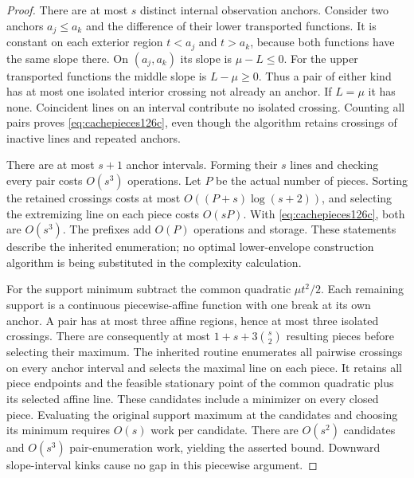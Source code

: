 \begin{proof}
There are at most $s$ distinct internal observation anchors.  Consider two
anchors $a_j\le a_k$ and the difference of their lower transported functions.
It is constant on each exterior region $t<a_j$ and $t>a_k$, because both
functions have the same slope there.  On $(a_j,a_k)$ its slope is
$\mu-L\le0$.  For the upper transported functions the middle slope is
$L-\mu\ge0$.  Thus a pair of either kind has at most one isolated interior
crossing not already an anchor.  If $L=\mu$ it has none.  Coincident lines
on an interval contribute no isolated crossing.  Counting all pairs proves
\eqref{eq:cachepieces126c}, even though the algorithm retains crossings of
inactive lines and repeated anchors.

There are at most $s+1$ anchor intervals.  Forming their $s$ lines and
checking every pair costs $O(s^3)$ operations.  Let $P$ be the actual
number of pieces.  Sorting the retained crossings costs at most
$O((P+s)\log(s+2))$, and selecting the extremizing line on each piece
costs $O(sP)$.  With \eqref{eq:cachepieces126c}, both are $O(s^3)$.
The prefixes add $O(P)$ operations and storage.  These statements describe
the inherited enumeration; no optimal lower-envelope construction algorithm
is being substituted in the complexity calculation.

For the support minimum subtract the common quadratic $\mu t^2/2$.
Each remaining support is a continuous piecewise-affine function with one
break at its own anchor.  A pair has at most three affine regions, hence
at most three isolated crossings.  There are consequently at most
$1+s+3\binom{s}{2}$ resulting pieces before selecting their maximum.
The inherited routine enumerates all pairwise crossings on every anchor
interval and selects the maximal line on each piece.  It retains all
piece endpoints and the feasible stationary point of the common quadratic
plus its selected affine line.  These candidates include a minimizer on
every closed piece.  Evaluating the original support maximum at the
candidates and choosing its minimum requires $O(s)$ work per candidate.
There are $O(s^2)$ candidates and $O(s^3)$ pair-enumeration work, yielding
the asserted bound.  Downward slope-interval kinks cause no gap in this
piecewise argument.
\end{proof}

